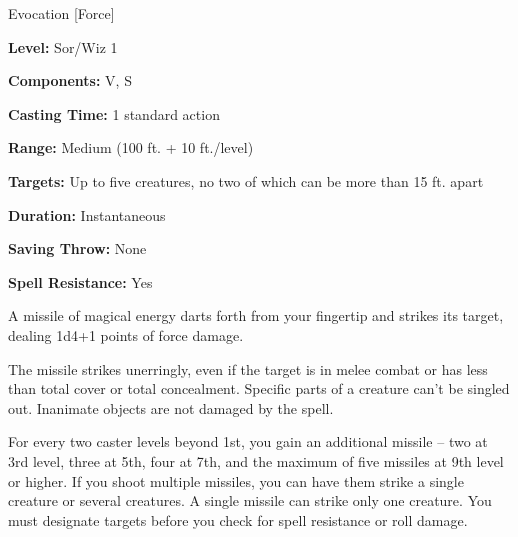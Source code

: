 
Evocation [Force]

\textbf{Level:} Sor/Wiz 1

\textbf{Components:} V, S

\textbf{Casting Time:} 1 standard action

\textbf{Range:} Medium (100 ft. + 10 ft./level)

\textbf{Targets:} Up to five creatures, no two of which can be more than 15 ft. 
apart

\textbf{Duration:} Instantaneous

\textbf{Saving Throw:} None

\textbf{Spell Resistance:} Yes

A missile of magical energy darts forth from your fingertip and strikes its target, 
dealing 1d4+1 points of force damage.

The missile strikes unerringly, even if the target is in melee combat or has less 
than total cover or total concealment. Specific parts of a creature can't be singled 
out. Inanimate objects are not damaged by the spell.

For every two caster levels beyond 1st, you gain an additional missile -- two at 
3rd level, three at 5th, four at 7th, and the maximum of five missiles at 9th level 
or higher. If you shoot multiple missiles, you can have them strike a single creature 
or several creatures. A single missile can strike only one creature. You must designate 
targets before you check for spell resistance or roll damage.

